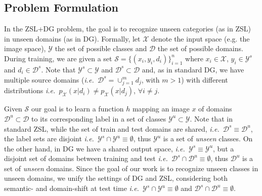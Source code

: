 \documentclass[runningheads]{llncs}
\newcommand{\ie}{\emph{i.e.~}}
\begin{document}
\subsection{Problem Formulation}
In the ZSL+DG problem, the goal is to recognize unseen categories (as in ZSL) in unseen domains (as in DG). Formally, let $\mathcal{X}$ denote the input space (e.g. the image space), $\mathcal{Y}$ the set of possible classes and $\mathcal{D}$ the set of possible domains. During training, we are given a set  $\mathcal{S}=\{(x_i,y_i,d_i)\}_{i=1}^n$ where $x_i\in\mathcal{X}$, $y_i \in \mathcal{Y}^s$ and $d_i \in \mathcal{D}^s$. Note that $\mathcal{Y}^s\subset \mathcal{Y}$ and $\mathcal{D}^s\subset \mathcal{D}$ and, as in standard DG, {we have multiple source domains (\ie $\mathcal{D}^s=\cup_{j=1}^m d_j$, with $m>1$) with} different distributions \ie $p_\mathcal{X}(x|d_i)\neq p_\mathcal{X}(x|d_j)$, $\forall i\neq j$.

Given $\mathcal{S}$ our goal is to learn a function $h$ mapping an image $x$ of 
domains $\mathcal{D}^u\subset \mathcal{D}$ to its corresponding label in a set of 
classes $\mathcal{Y}^u\subset \mathcal{Y}$. Note that in standard ZSL, {while the set of train and test domains are shared, \ie $\mathcal{D}^s\equiv\mathcal{D}^u$}, the label sets are disjoint \ie $\mathcal{Y}^s\cap\mathcal{Y}^u \equiv \emptyset$, {thus $\mathcal{Y}^u$ is a set of \textit{unseen} classes. } On the other hand, in DG we have {a shared output space}, \ie $\mathcal{Y}^s\equiv\mathcal{Y}^u$, but a disjoint set of domains between training and test \ie $\mathcal{D}^s\cap\mathcal{D}^u \equiv \emptyset$, {thus $\mathcal{D}^u$ is a set of \textit{unseen} domains}. Since the goal of our work is to recognize unseen classes in unseen domains, we unify the settings of DG and ZSL, considering both semantic- and domain-shift at test time \ie $\mathcal{Y}^s\cap\mathcal{Y}^u \equiv \emptyset$ and $\mathcal{D}^s\cap\mathcal{D}^u \equiv \emptyset$.
\end{document}
